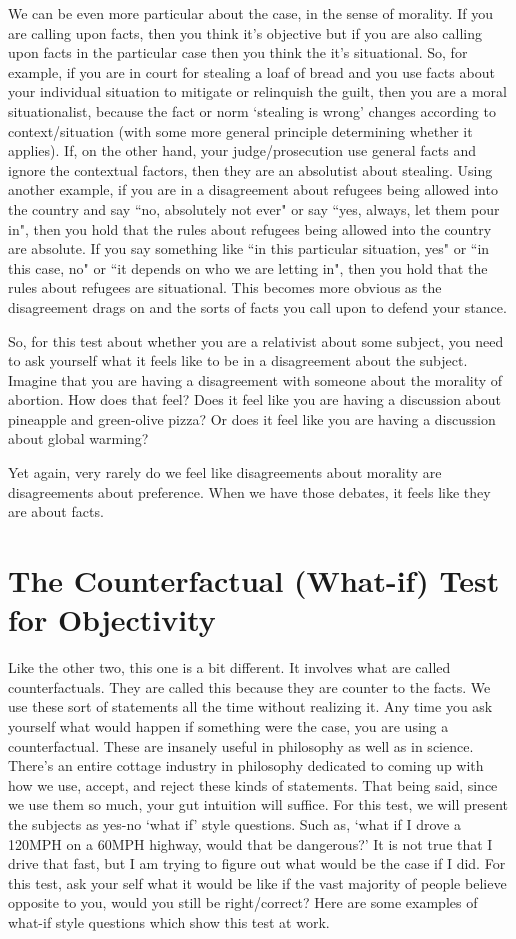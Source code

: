 We can be even more particular about the case, in the sense of morality. If you are calling upon facts, then you think it's objective but if you are also calling upon facts in the particular case then you think the it's situational. So, for example, if you are in court for stealing a loaf of bread and you use facts about your individual situation to mitigate or relinquish the guilt, then you are a moral situationalist, because the fact or norm `stealing is wrong' changes according to context/situation (with some more general principle determining whether it applies). If, on the other hand, your judge/prosecution use general facts and ignore the contextual factors, then they are an absolutist about stealing. Using another example, if you are in a disagreement about refugees being allowed into the country and say ``no, absolutely not ever" or say ``yes, always, let them pour in", then you hold that the rules about refugees being allowed into the country are absolute. If you say something like ``in this particular situation, yes" or ``in this case, no" or ``it depends on who we are letting in", then you hold that the rules about refugees are situational. This becomes more obvious as the disagreement drags on and the sorts of facts you call upon to defend your stance.  

So, for this test about whether you are a relativist about some subject, you need to ask yourself what it feels like to be in a disagreement about the subject. Imagine that you are having a disagreement with someone about the morality of abortion. How does that feel? Does it feel like you are having a discussion about pineapple and green-olive pizza? Or does it feel like you are having a discussion about global warming?

Yet again, very rarely do we feel like disagreements about morality are disagreements about preference. When we have those debates, it feels like they are about facts.

\section{The Counterfactual (What-if) Test for Objectivity}

Like the other two, this one is a bit different. It involves what are called counterfactuals. They are called this because they are counter to the facts. We use these sort of statements all the time without realizing it. Any time you ask yourself what would happen if something were the case, you are using a counterfactual. These are insanely useful in philosophy as well as in science. There's an entire cottage industry in philosophy dedicated to coming up with how we use, accept, and reject these kinds of statements. That being said, since we use them so much, your gut intuition will suffice. For this test, we will present the subjects as yes-no `what if' style questions. Such as, ‘what if I drove a 120MPH on a 60MPH highway, would that be dangerous?’ It is not true that I drive that fast, but I am trying to figure out what would be the case if I did. For this test, ask your self what it would be like if the vast majority of people believe opposite to you, would you still be right/correct? Here are some examples of what-if style questions which show this test at work.

